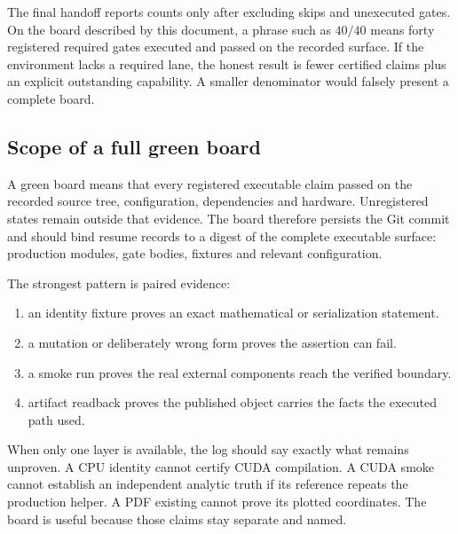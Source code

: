 \documentclass[10pt,aps,prd,twocolumn,nofootinbib]{revtex4-2}
\begin{document}
The final handoff reports counts only after excluding skips and unexecuted
gates.  On the board described by this document, a phrase such as \(40/40\)
means forty registered required gates executed and passed on the recorded
surface.  If the environment lacks
a required lane, the honest result is fewer certified claims plus an explicit
outstanding capability.  A smaller denominator would falsely present a
complete board.

\subsection{Scope of a full green board}

A green board means that every registered executable claim passed on the
recorded source tree, configuration, dependencies and hardware.  Unregistered
states remain outside that evidence.  The board therefore persists the
Git commit and should bind resume records to a digest of the complete
executable surface: production modules, gate bodies, fixtures and relevant
configuration.

The strongest pattern is paired evidence:
\begin{enumerate}
  \item an identity fixture proves an exact mathematical or serialization
        statement.
  \item a mutation or deliberately wrong form proves the assertion can fail.
  \item a smoke run proves the real external components reach the verified
        boundary.
  \item artifact readback proves the published object carries the facts the
        executed path used.
\end{enumerate}
When only one layer is available, the log should say exactly what remains
unproven.  A CPU identity cannot certify CUDA compilation.  A CUDA smoke
cannot establish an independent analytic truth if its reference repeats the
production helper.  A PDF existing cannot prove its plotted coordinates.
The board is useful because those claims stay separate and named.
\end{document}
